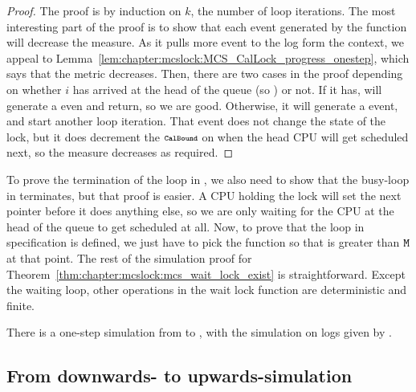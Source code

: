 \begin{proof}
The proof is by induction on $k$, the number of loop iterations. The
most interesting part of the proof is to show that each event
generated by the function will decrease the measure.
As it pulls more event to the log form the context, we appeal to
Lemma~\ref{lem:chapter:mcslock:MCS_CalLock_progress_onestep}, which says that the metric decreases. 
Then, there are two cases in the proof depending on whether $i$ has
arrived at the head of the queue (so ) or not. If it has,
 will generate a 
even and return, so we are good. 
Otherwise, it will generate a  event, and
start another loop iteration. That event does not change the state of
the lock, but it does decrement the $\CalBound$ on when the head CPU
will get scheduled next, so the measure decreases as required.
\end{proof}

To prove the termination of the loop in , 
we also need to show that the busy-loop in  terminates, 
but that proof is easier. A CPU holding the lock will set
the next pointer before it does anything else, so we are only waiting
for the CPU at the head of the queue to get scheduled at all.
Now, to prove that the loop in  specification
is defined, we just have to pick the function 
so that  is greater than ${\mathrm{\texttt{M}}}$ at that
point. The rest of the simulation proof for Theorem~\ref{thm:chapter:mcslock:mcs_wait_lock_exist} is straightforward.
Except the waiting loop, other operations in the wait lock function are deterministic and finite. 


\begin{theorem}
There is a one-step simulation from  to
, with the simulation on logs given by .
\end{theorem}


\subsection{From downwards- to upwards-simulation}
\label{chapter:mcslock:sec:downwards-to-upwards}

